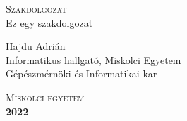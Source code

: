 \documentclass{book}
\begin{document}
\begin{titlepage}

\begin{center}
\linespread{2}
\LARGE{\textsc{Szakdolgozat}}
\\
\Large{Ez egy szakdolgozat}
\end{center}
\vspace{5cm}

\begin{center}
\large{Hajdu Adrián}
\\
\normalsize{Informatikus hallgató, Miskolci Egyetem}
\\
\normalsize{Gépészmérnöki és Informatikai kar}
\end{center}
\vspace{5cm}

\begin{center}
\Large{\textsc{Miskolci egyetem}}
\\
\large{\textbf{2022}}
\end{center}

\end{titlepage}
\end{document}
